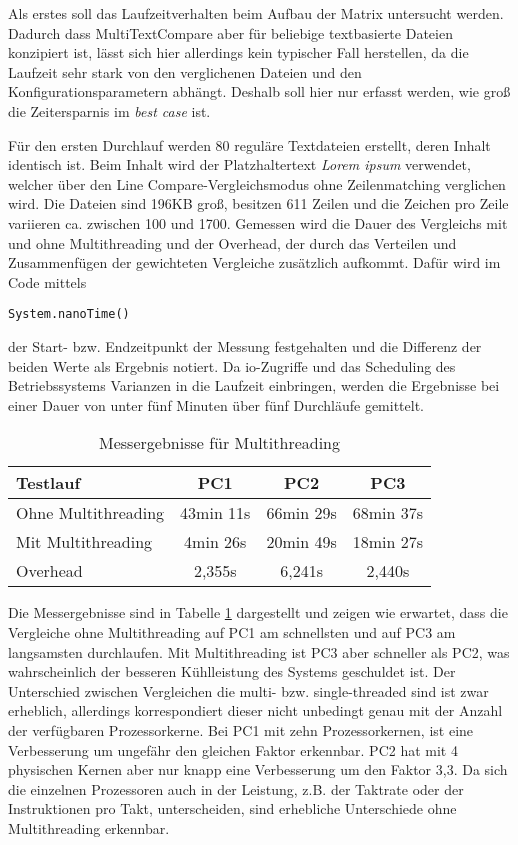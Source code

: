 Als erstes soll das Laufzeitverhalten beim Aufbau der Matrix untersucht werden. Dadurch dass MultiTextCompare aber für beliebige textbasierte Dateien konzipiert ist, lässt sich hier allerdings kein \glqq typischer\grqq{} Fall herstellen, da die Laufzeit sehr stark von den verglichenen Dateien und den Konfigurationsparametern abhängt. Deshalb soll hier nur erfasst werden, wie groß die Zeitersparnis im \emph{best case} ist.

Für den ersten Durchlauf werden 80 reguläre Textdateien erstellt, deren Inhalt identisch ist. Beim Inhalt wird der Platzhaltertext \emph{Lorem ipsum} verwendet, welcher über den Line Compare-Vergleichsmodus ohne Zeilenmatching verglichen wird. Die Dateien sind 196KB groß, besitzen 611 Zeilen und die Zeichen pro Zeile variieren ca. zwischen 100 und 1700. Gemessen wird die Dauer des Vergleichs mit und ohne Multithreading und der Overhead, der durch das Verteilen und Zusammenfügen der gewichteten Vergleiche zusätzlich aufkommt. Dafür wird im Code mittels 
\begin{verbatim}
System.nanoTime()
\end{verbatim}

der Start- bzw. Endzeitpunkt der Messung festgehalten und die Differenz der beiden Werte als Ergebnis notiert. Da \acrshort{io}-Zugriffe und das Scheduling des Betriebssystems Varianzen in die Laufzeit einbringen, werden die Ergebnisse bei einer Dauer von unter fünf Minuten über fünf Durchläufe gemittelt.

\begin{table}[!htb]
\centering
\begin{tabular}{|l|c|c|c|}
\hline
Testlauf            & PC1 & PC2 & PC3 \\ \hline
Ohne Multithreading & 43min 11s  & 66min 29s  & 68min 37s  \\ \hline
Mit Multithreading  & 4min 26s  & 20min 49s  & 18min 27s  \\ \hline
Overhead            & 2,355s  & 6,241s  & 2,440s  \\ \hline
\end{tabular}

\caption{Messergebnisse für Multithreading}
\label{table:multithreading}
\end{table}

Die Messergebnisse sind in Tabelle \ref{table:multithreading} dargestellt und zeigen wie erwartet, dass die Vergleiche ohne Multithreading auf PC1 am schnellsten und auf PC3 am langsamsten durchlaufen. Mit Multithreading ist PC3 aber schneller als PC2, was wahrscheinlich der besseren Kühlleistung des Systems geschuldet ist. Der Unterschied zwischen Vergleichen die multi- bzw. single-threaded sind ist zwar erheblich, allerdings korrespondiert dieser nicht unbedingt genau mit der Anzahl der verfügbaren Prozessorkerne. Bei PC1 mit zehn Prozessorkernen, ist eine Verbesserung um ungefähr den gleichen Faktor erkennbar. PC2 hat mit 4 physischen Kernen aber nur knapp eine Verbesserung um den Faktor 3,3. Da sich die einzelnen Prozessoren auch in der Leistung, z.B. der Taktrate oder der Instruktionen pro Takt, unterscheiden, sind erhebliche Unterschiede ohne Multithreading erkennbar. 

